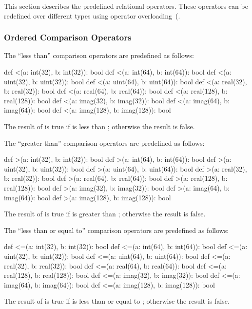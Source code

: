 This section describes the predefined relational operators.  These
operators can be redefined over different types using operator
overloading~(.

\subsubsection{Ordered Comparison Operators}
\label{Ordered_Comparison_Operators}

The ``less than'' comparison operators are predefined as follows:
\begin{chapel}
def <(a: int(32), b: int(32)): bool
def <(a: int(64), b: int(64)): bool
def <(a: uint(32), b: uint(32)): bool
def <(a: uint(64), b: uint(64)): bool
def <(a: real(32), b: real(32)): bool
def <(a: real(64), b: real(64)): bool
def <(a: real(128), b: real(128)): bool
def <(a: imag(32), b: imag(32)): bool
def <(a: imag(64), b: imag(64)): bool
def <(a: imag(128), b: imag(128)): bool
\end{chapel}
The result of  is true if  is less than ;
otherwise the result is false.

The ``greater than'' comparison operators are predefined as follows:
\begin{chapel}
def >(a: int(32), b: int(32)): bool
def >(a: int(64), b: int(64)): bool
def >(a: uint(32), b: uint(32)): bool
def >(a: uint(64), b: uint(64)): bool
def >(a: real(32), b: real(32)): bool
def >(a: real(64), b: real(64)): bool
def >(a: real(128), b: real(128)): bool
def >(a: imag(32), b: imag(32)): bool
def >(a: imag(64), b: imag(64)): bool
def >(a: imag(128), b: imag(128)): bool
\end{chapel}
The result of  is true if  is greater
than ; otherwise the result is false.

The ``less than or equal to'' comparison operators are predefined as
follows:
\begin{chapel}
def <=(a: int(32), b: int(32)): bool
def <=(a: int(64), b: int(64)): bool
def <=(a: uint(32), b: uint(32)): bool
def <=(a: uint(64), b: uint(64)): bool
def <=(a: real(32), b: real(32)): bool
def <=(a: real(64), b: real(64)): bool
def <=(a: real(128), b: real(128)): bool
def <=(a: imag(32), b: imag(32)): bool
def <=(a: imag(64), b: imag(64)): bool
def <=(a: imag(128), b: imag(128)): bool
\end{chapel}
The result of  is true if  is less than or equal
to ; otherwise the result is false.

